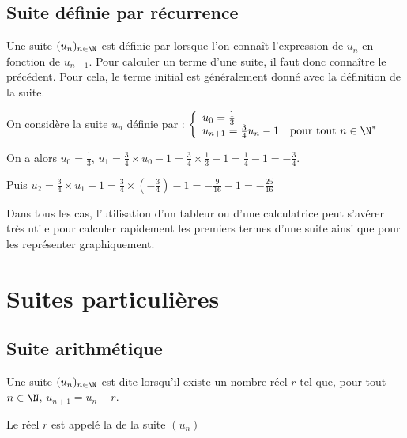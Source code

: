 \documentclass[10pt,openright,twoside,french]{book}
\begin{document}
\subsection{Suite définie par récurrence}

\begin{Defi}
    Une suite $(u_n)_{n\in \N}$ est définie par   lorsque l'on connaît l'expression de $u_n$ en fonction de $u_{n-1}$. Pour calculer un terme d'une suite, il faut donc connaître le précédent. Pour cela, le terme initial est généralement donné avec la définition de la suite.
\end{Defi}

\begin{Exemple}
    On considère la suite $u_n$ définie par :
    $\left\{
    \begin{array}{l}
        u_0 = \frac 13\\
        u_{n +1} = \frac 34 u_n - 1 \quad \text{pour tout $n\in \N^*$}
    \end{array}
    \right.$\par\medskip
    On a alors $u_0 = \frac 13$, $u_1 = \frac 3 4 \times u_0 - 1 = \frac34 \times \frac 13 - 1 = \frac 14 - 1 = -\frac34$.\par
    Puis $u_2 = \frac 3 4 \times u_1 - 1 = \frac34 \times \left(-\frac 34\right) - 1 = -\frac{9}{16} - 1 = -\frac{25}{16}$
\end{Exemple}

\begin{Rmq}
    Dans tous les cas, l'utilisation d'un tableur ou d'une calculatrice peut s'avérer très utile pour calculer rapidement les premiers termes d'une suite ainsi que pour les représenter graphiquement.
\end{Rmq}

\section{Suites particulières}
\subsection{Suite arithmétique}

\begin{Defi}
    Une suite $(u_n)_{n\in \N}$ est dite   lorsqu'il existe un nombre réel $r$ tel que, pour tout $n \in \N$, $u_{n+1} = u_n + r$.\par
    Le réel $r$ est appelé la  de la suite $(u_n)$
\end{Defi}\medskip
\end{document}
